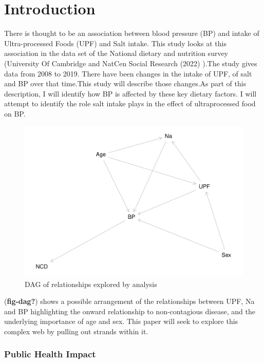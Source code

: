 \documentclass[
]{article}
\begin{document}
\newpage

\hypertarget{introduction}{%
\section{Introduction}\label{introduction}}

There is thought to be an association between blood pressure (BP) and
intake of Ultra-processed Foods (UPF) and Salt intake. This study looks
at this association in the data set of the National dietary and
nutrition survey (University Of Cambridge and NatCen Social Research
(2022) ).The study gives data from 2008 to 2019. There have been changes
in the intake of UPF, of salt and BP over that time.This study will
describe those changes.As part of this description, I will identify how
BP is affected by these key dietary factors. I will attempt to identify
the role salt intake plays in the effect of ultraprocessed food on BP.

\begin{figure}
\centering
\includegraphics{methodandresults_files/figure-latex/fig-dag-1.pdf}
\caption{DAG of relationships explored by analysis}
\end{figure}

(\textbf{fig-dag?}) shows a possible arrangement of the relationships
between UPF, Na and BP highlighting the onward relationship to
non-contagious disease, and the underlying importance of age and sex.
This paper will seek to explore this complex web by pulling out strands
within it.

\hypertarget{public-health-impact}{%
\subsubsection{Public Health Impact}\label{public-health-impact}}
\end{document}
